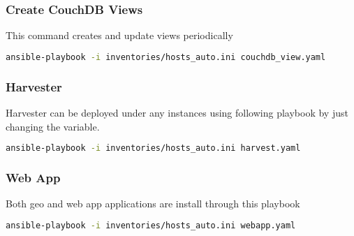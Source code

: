 \subsubsection{Create CouchDB Views}
This command creates and update views periodically 
\begin{lstlisting}[language=bash]
ansible-playbook -i inventories/hosts_auto.ini couchdb_view.yaml 
\end{lstlisting}

\subsubsection{Harvester}
Harvester can be deployed under any instances using following playbook by just changing the variable.
\begin{lstlisting}[language=bash]
ansible-playbook -i inventories/hosts_auto.ini harvest.yaml 
\end{lstlisting}

\subsubsection{Web App}
Both geo and web app applications are install through this playbook
\begin{lstlisting}[language=bash]
ansible-playbook -i inventories/hosts_auto.ini webapp.yaml 
\end{lstlisting}

